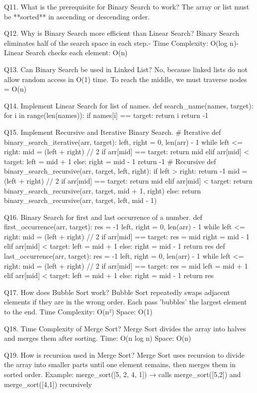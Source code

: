  Q11. What is the prerequisite for Binary Search to work?
 The array or list must be **sorted** in ascending or descending order.


 Q12. Why is Binary Search more efficient than Linear Search?
 Binary Search eliminates half of the search space in each step.- Time Complexity: O(log n)- Linear Search checks each element: O(n)


 Q13. Can Binary Search be used in Linked List?
 No, because linked lists do not allow random access in O(1) time.
 To reach the middle, we must traverse nodes = O(n)


 Q14. Implement Linear Search for list of names.
 def search_name(names, target):
 for i in range(len(names)):
 if names[i] == target:
 return i
 return -1


 Q15. Implement Recursive and Iterative Binary Search.
 # Iterative
 def binary_search_iterative(arr, target):
 left, right = 0, len(arr) - 1
 while left <= right:
 mid = (left + right) // 2
if arr[mid] == target:
 return mid
 elif arr[mid] < target:
 left = mid + 1
 else:
 right = mid - 1
 return -1
 # Recursive
 def binary_search_recursive(arr, target, left, right):
 if left > right:
 return -1
 mid = (left + right) // 2
 if arr[mid] == target:
 return mid
 elif arr[mid] < target:
 return binary_search_recursive(arr, target, mid + 1, right)
 else:
 return binary_search_recursive(arr, target, left, mid - 1)


 
 Q16. Binary Search for first and last occurrence of a number.
 def first_occurrence(arr, target):
 res = -1
 left, right = 0, len(arr) - 1
 while left <= right:
 mid = (left + right) // 2
 if arr[mid] == target:
 res = mid
 right = mid - 1
 elif arr[mid] < target:
 left = mid + 1
 else:
 right = mid - 1
 return res
 def last_occurrence(arr, target):
 res = -1
 left, right = 0, len(arr) - 1
 while left <= right:
 mid = (left + right) // 2
 if arr[mid] == target:
 res = mid
 left = mid + 1
 elif arr[mid] < target:
 left = mid + 1
 else:
 right = mid - 1
 return res


 Q17. How does Bubble Sort work?
 Bubble Sort repeatedly swaps adjacent elements if they are in the wrong order.
 Each pass 'bubbles' the largest element to the end.
Time Complexity: O(n²)
 Space: O(1)


 Q18. Time Complexity of Merge Sort?
 Merge Sort divides the array into halves and merges them after sorting.
 Time: O(n log n)
 Space: O(n)


 Q19. How is recursion used in Merge Sort?
 Merge Sort uses recursion to divide the array into smaller parts until one element remains, then
 merges them in sorted order.
 Example:
 merge_sort([5, 2, 4, 1]) → calls merge_sort([5,2]) and merge_sort([4,1]) recursively



